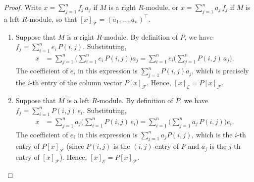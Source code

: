 \begin{proof}
    Write $x = \sum_{j=1}^n f_j \, a_j$ if $M$ is a right $R$-module, or $x = \sum_{j=1}^n a_j \, f_j$ if $M$ is a left $R$-module, so that $[x]_\mathcal{F} = (a_1,\ldots,a_n)^\top$.

    \begin{enumerate}
        \item Suppose that $M$ is a right $R$-module. By definition of $P$, we have $f_j = \sum_{i=1}^n e_i \, P(i,j)$. Substituting,
        \begin{align*}
            x &= \sum_{j=1}^n \bigl( \sum_{i=1}^n e_i \, P(i,j) \bigr) a_j
              = \sum_{i=1}^n e_i \bigl( \sum_{j=1}^n P(i,j) \, a_j \bigr).
        \end{align*}
        The coefficient of $e_i$ in this expression is $\sum_{j=1}^n P(i,j) a_j$, which is precisely the $i$-th entry of the column vector $P [x]_\mathcal{F}$. Hence, $[x]_\mathcal{E} = P [x]_\mathcal{F}$.

        \item Suppose that $M$ is a left $R$-module. By definition of $P$, we have $f_j = \sum_{i=1}^n P(i,j) \, e_i$. Substituting,
        \begin{align*}
            x &= \sum_{j=1}^n a_j \bigl( \sum_{i=1}^n P(i,j) \, e_i \bigr)
              = \sum_{i=1}^n \bigl( \sum_{j=1}^n a_j \, P(i,j) \bigr) e_i.
        \end{align*}
        The coefficient of $e_i$ in this expression is $\sum_{j=1}^n a_j P(i,j)$, which is the $i$-th entry of $P [x]_\mathcal{F}$ (since $P(i,j)$ is the $(i,j)$-entry of $P$ and $a_j$ is the $j$-th entry of $[x]_\mathcal{F}$). Hence, $[x]_\mathcal{E} = P [x]_\mathcal{F}$.
    \end{enumerate}
\end{proof}
